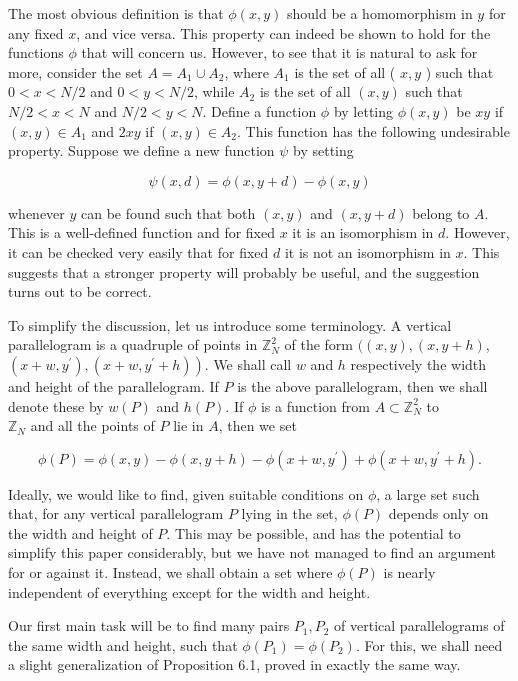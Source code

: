 \documentclass[10pt]{article}
\begin{document}
The most obvious definition is that $\phi(x, y)$ should be a homomorphism in $y$ for any fixed $x$, and vice versa. This property can indeed be shown to hold for the functions $\phi$ that will concern us. However, to see that it is natural to ask for more, consider the set $A=A_{1} \cup A_{2}$, where $A_{1}$ is the set of all ( $x, y$ ) such that $0<x<N / 2$ and $0<y<N / 2$, while $A_{2}$ is the set of all $(x, y)$ such that $N / 2<x<N$ and $N / 2<y<N$. Define a function $\phi$ by letting $\phi(x, y)$ be $x y$ if $(x, y) \in A_{1}$ and $2 x y$ if $(x, y) \in A_{2}$. This function has the following undesirable property. Suppose we define a new function $\psi$ by setting

$$
\psi(x, d)=\phi(x, y+d)-\phi(x, y)
$$

whenever $y$ can be found such that both $(x, y)$ and $(x, y+d)$ belong to $A$. This is a well-defined function and for fixed $x$ it is an isomorphism in $d$. However, it can be checked very easily that for fixed $d$ it is not an isomorphism in $x$. This suggests that a stronger property will probably be useful, and the suggestion turns out to be correct.

To simplify the discussion, let us introduce some terminology. A vertical parallelogram is a quadruple of points in $\mathbb{Z}_{N}^{2}$ of the form $((x, y),(x, y+h)$, $\left.\left(x+w, y^{\prime}\right),\left(x+w, y^{\prime}+h\right)\right)$. We shall call $w$ and $h$ respectively the width and height of the parallelogram. If $P$ is the above parallelogram, then we shall denote these by $w(P)$ and $h(P)$. If $\phi$ is a function from $A \subset \mathbb{Z}_{N}^{2}$ to\\
$\mathbb{Z}_{N}$ and all the points of $P$ lie in $A$, then we set

$$
\phi(P)=\phi(x, y)-\phi(x, y+h)-\phi\left(x+w, y^{\prime}\right)+\phi\left(x+w, y^{\prime}+h\right) .
$$

Ideally, we would like to find, given suitable conditions on $\phi$, a large set such that, for any vertical parallelogram $P$ lying in the set, $\phi(P)$ depends only on the width and height of $P$. This may be possible, and has the potential to simplify this paper considerably, but we have not managed to find an argument for or against it. Instead, we shall obtain a set where $\phi(P)$ is nearly independent of everything except for the width and height.

Our first main task will be to find many pairs $P_{1}, P_{2}$ of vertical parallelograms of the same width and height, such that $\phi\left(P_{1}\right)=\phi\left(P_{2}\right)$. For this, we shall need a slight generalization of Proposition 6.1, proved in exactly the same way.
\end{document}
